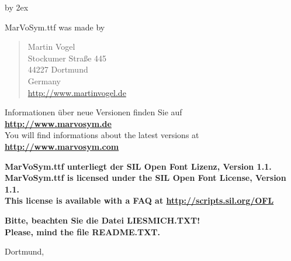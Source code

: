 \documentclass[a4paper,12pt]{article}
\begin{document}
\needspace{.25\textheight}

\bigskip

\begin{description}
\advance\itemsep by 2ex
\def\Item#1#2{%
  \item[{%
    \textcolor{#1}{\rlap{%
      \sbox0{\fontsize{35pt}{35pt}\mvchr{#2}}%
      \settoheight{\dimen0}{M}%
      \raisebox{.5\dimexpr\dimen0-\ht0\relax}{\copy0}%
    }}%
    \kern\leftmargin
    \kern-\labelsep
  }]%
}
\Item{infoblue}{105}
  MarVoSym.ttf was made by
  \begin{quote}
    Martin Vogel\\
    Stockumer Stra\ss e 445\\
    44227 Dortmund\\
    Germany\\
    \url{http://www.martinvogel.de}
  \end{quote}
  Informationen \"uber neue Versionen finden Sie auf\\
  {\bfseries\url{http://www.marvosym.de}}\\[1ex]
  You will find informations about the latest versions at\\
  {\bfseries\url{http://www.marvosym.com}}

\Item{smileygreen}{169}
  \begingroup\bfseries
    \foreignlanguage{ngerman}{%
    MarVoSym.ttf unterliegt der SIL Open Font Lizenz, Version 1.1.}\\[1ex]
    MarVoSym.ttf is licensed under the SIL Open Font License, Version 1.1.\\
    This license is available with a FAQ at \url{http://scripts.sil.org/OFL}
  \endgroup

\Item{stopred}{33}
  \begingroup\bfseries
    Bitte, beachten Sie die Datei LIESMICH.TXT!\\[1ex]
    Please, mind the file README.TXT.
  \endgroup

\end{description}

\bigskip

\noindent
Dortmund, \DATE
\end{document}
